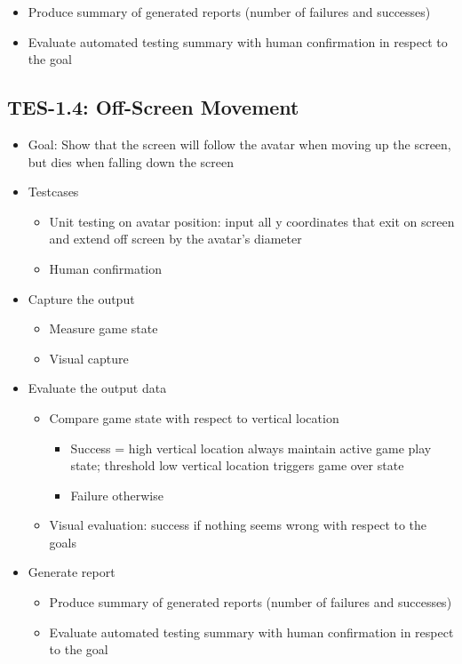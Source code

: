 \begin{itemize}
\begin{itemize}
\item Produce summary of generated reports (number of failures and successes)
\item Evaluate automated testing summary with human confirmation in respect to the goal
\end{itemize}
\end{itemize}


\subsection{TES-1.4: Off-Screen Movement}
\begin{itemize}
\item Goal: Show that the screen will follow the avatar when moving up the screen, but dies when falling down the screen

\item Testcases
\begin{itemize}
\item Unit testing on avatar position: input all y coordinates that exit on screen and extend off screen by the avatar’s diameter
\item Human confirmation
\end{itemize}

\item Capture the output
\begin{itemize}
\item Measure game state
\item Visual capture
\end{itemize}

\item Evaluate the output data
\begin{itemize}
\item Compare game state with respect to vertical location
\begin{itemize}
\item Success = high vertical location always maintain active game play state; threshold low vertical location triggers game over state
\item Failure otherwise
\end{itemize}
\item Visual evaluation: success if nothing seems wrong with respect to the goals
\end{itemize}

\item Generate report
\begin{itemize}
\item Produce summary of generated reports (number of failures and successes)
\item Evaluate automated testing summary with human confirmation in respect to the goal
\end{itemize}
\end{itemize}


